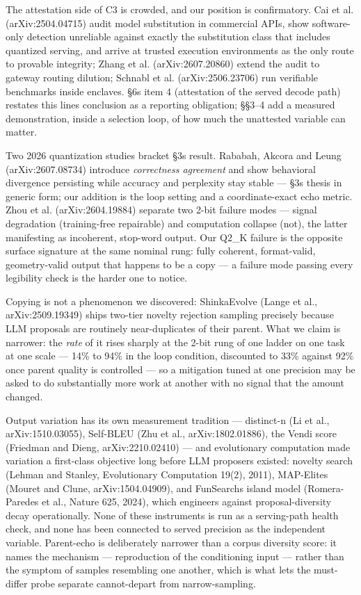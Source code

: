 The attestation side of C3 is crowded, and our position is confirmatory. Cai et al. (arXiv:2504.04715) audit model substitution in commercial APIs, show software-only detection unreliable against exactly the substitution class that includes quantized serving, and arrive at trusted execution environments as the only route to provable integrity; Zhang et al. (arXiv:2607.20860) extend the audit to gateway routing dilution; Schnabl et al. (arXiv:2506.23706) run verifiable benchmarks inside enclaves. §6\textquotesingle s item 4 (attestation of the served decode path) restates this line\textquotesingle s conclusion as a reporting obligation; §§3--4 add a measured demonstration, inside a selection loop, of how much the unattested variable can matter.

Two 2026 quantization studies bracket §3\textquotesingle s result. Rababah, Akcora and Leung (arXiv:2607.08734) introduce \emph{correctness agreement} and show behavioral divergence persisting while accuracy and perplexity stay stable --- §3\textquotesingle s thesis in generic form; our addition is the loop setting and a coordinate-exact echo metric. Zhou et al. (arXiv:2604.19884) separate two 2-bit failure modes --- signal degradation (training-free repairable) and computation collapse (not), the latter manifesting as incoherent, stop-word output. Our Q2\_K failure is the opposite surface signature at the same nominal rung: fully coherent, format-valid, geometry-valid output that happens to be a copy --- a failure mode passing every legibility check is the harder one to notice.

Copying is not a phenomenon we discovered: ShinkaEvolve (Lange et al., arXiv:2509.19349) ships two-tier novelty rejection sampling precisely because LLM proposals are routinely near-duplicates of their parent. What we claim is narrower: the \emph{rate} of it rises sharply at the 2-bit rung of one ladder on one task at one scale --- 14\% to 94\% in the loop condition, discounted to 33\% against 92\% once parent quality is controlled --- so a mitigation tuned at one precision may be asked to do substantially more work at another with no signal that the amount changed.

Output variation has its own measurement tradition --- distinct-n (Li et al., arXiv:1510.03055), Self-BLEU (Zhu et al., arXiv:1802.01886), the Vendi score (Friedman and Dieng, arXiv:2210.02410) --- and evolutionary computation made variation a first-class objective long before LLM proposers existed: novelty search (Lehman and Stanley, Evolutionary Computation 19(2), 2011), MAP-Elites (Mouret and Clune, arXiv:1504.04909), and FunSearch\textquotesingle s island model (Romera-Paredes et al., Nature 625, 2024), which engineers against proposal-diversity decay operationally. None of these instruments is run as a serving-path health check, and none has been connected to served precision as the independent variable. Parent-echo is deliberately narrower than a corpus diversity score: it names the mechanism --- reproduction of the conditioning input --- rather than the symptom of samples resembling one another, which is what lets the must-differ probe separate cannot-depart from narrow-sampling.

